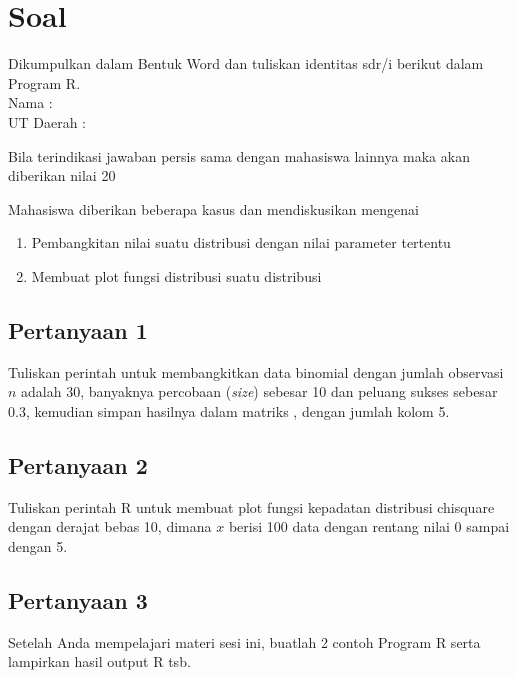 \section{Soal}


Dikumpulkan dalam Bentuk Word dan tuliskan identitas sdr/i berikut dalam Program R. \\
Nama : \\
UT Daerah :

\noindent Bila terindikasi jawaban persis sama dengan mahasiswa lainnya maka akan diberikan nilai 20

\noindent Mahasiswa diberikan beberapa kasus dan mendiskusikan mengenai

\begin{enumerate}[nosep]
    \item Pembangkitan nilai suatu distribusi dengan nilai parameter tertentu
    \item Membuat plot fungsi distribusi suatu distribusi
\end{enumerate}

\subsection*{Pertanyaan 1}

Tuliskan perintah untuk membangkitkan data binomial dengan jumlah observasi $n$ adalah 30, banyaknya percobaan (\textit{size}) sebesar 10 dan peluang sukses sebesar 0.3, kemudian simpan hasilnya dalam matriks , dengan jumlah kolom 5.

\subsection*{Pertanyaan 2}

Tuliskan perintah R untuk membuat plot fungsi kepadatan distribusi chisquare dengan derajat bebas 10, dimana $x$ berisi 100 data dengan rentang nilai 0 sampai dengan 5.

\subsection*{Pertanyaan 3}

Setelah Anda mempelajari materi sesi ini, buatlah 2 contoh Program R serta lampirkan hasil output R tsb.